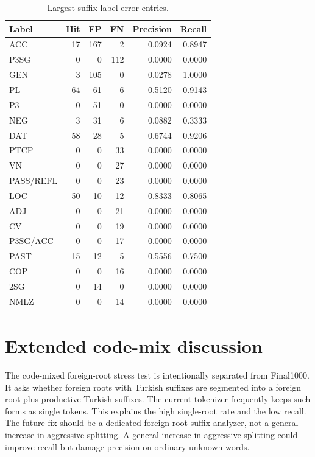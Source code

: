 \documentclass[11pt]{article}
\begin{document}
\begin{table}[h]
\centering
\caption{Largest suffix-label error entries.}
\label{tab:label-extra}
\small
\begin{tabular}{lrrrrr}
\toprule
Label & Hit & FP & FN & Precision & Recall \\
\midrule
ACC & 17 & 167 & 2 & 0.0924 & 0.8947 \\
P3SG & 0 & 0 & 112 & 0.0000 & 0.0000 \\
GEN & 3 & 105 & 0 & 0.0278 & 1.0000 \\
PL & 64 & 61 & 6 & 0.5120 & 0.9143 \\
P3 & 0 & 51 & 0 & 0.0000 & 0.0000 \\
NEG & 3 & 31 & 6 & 0.0882 & 0.3333 \\
DAT & 58 & 28 & 5 & 0.6744 & 0.9206 \\
PTCP & 0 & 0 & 33 & 0.0000 & 0.0000 \\
VN & 0 & 0 & 27 & 0.0000 & 0.0000 \\
PASS/REFL & 0 & 0 & 23 & 0.0000 & 0.0000 \\
LOC & 50 & 10 & 12 & 0.8333 & 0.8065 \\
ADJ & 0 & 0 & 21 & 0.0000 & 0.0000 \\
CV & 0 & 0 & 19 & 0.0000 & 0.0000 \\
P3SG/ACC & 0 & 0 & 17 & 0.0000 & 0.0000 \\
PAST & 15 & 12 & 5 & 0.5556 & 0.7500 \\
COP & 0 & 0 & 16 & 0.0000 & 0.0000 \\
2SG & 0 & 14 & 0 & 0.0000 & 0.0000 \\
NMLZ & 0 & 0 & 14 & 0.0000 & 0.0000 \\
\bottomrule
\end{tabular}
\end{table}

\section{Extended code-mix discussion}
The code-mixed foreign-root stress test is intentionally separated from Final1000. It asks whether foreign roots with Turkish suffixes are segmented into a foreign root plus productive Turkish suffixes. The current tokenizer frequently keeps such forms as single tokens. This explains the high single-root rate and the low recall. The future fix should be a dedicated foreign-root suffix analyzer, not a general increase in aggressive splitting. A general increase in aggressive splitting could improve recall but damage precision on ordinary unknown words.
\end{document}
